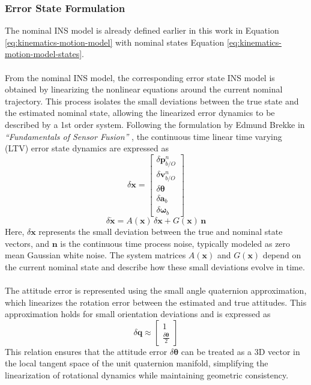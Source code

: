 \subsubsection{Error State Formulation}
The nominal INS model is already defined earlier in this work in Equation \ref{eq:kinematics-motion-model} with nominal states Equation \ref{eq:kinematics-motion-model-states}.
\\ \\
From the nominal INS model, the corresponding error state INS model is obtained by linearizing the nonlinear equations around the current nominal trajectory. This process isolates the small deviations between the true state and the estimated nominal state, allowing the linearized error dynamics to be described by a 1st order system. Following the formulation by Edmund Brekke in \textit{``Fundamentals of Sensor Fusion''} \cite{sensor_fusion_book}, the continuous time linear time varying (LTV) error state dynamics are expressed as
$$
    \delta\mathbf{x} =
    \begin{bmatrix}
        \delta\mathbf{p}_{b/O}^{n} \\
        \delta\mathbf{v}_{b/O}^{n} \\
        \delta\mathbf{\theta} \\
        \delta\mathbf{a}_b \\
        \delta\mathbf{\omega}_b
    \end{bmatrix}
$$
$$
    \delta\dot{\mathbf{x}} = A(\mathbf{x}) \, \delta\mathbf{x} + G(\mathbf{x})\,\mathbf{n}
$$
Here, $\delta\mathbf{x}$ represents the small deviation between the true and nominal state vectors, and $\mathbf{n}$ is the continuous time process noise, typically modeled as zero mean Gaussian white noise. The system matrices $A(\mathbf{x})$ and $G(\mathbf{x})$ depend on the current nominal state and describe how these small deviations evolve in time.  
\\ \\
The attitude error is represented using the small angle quaternion approximation, which linearizes the rotation error between the estimated and true attitudes. This approximation holds for small orientation deviations and is expressed as
$$
    \delta\mathbf{q} \approx
    \begin{bmatrix}
        1 \\
        \tfrac{\delta\boldsymbol{\theta}}{2}
    \end{bmatrix}
$$
This relation ensures that the attitude error $\delta\boldsymbol{\theta}$ can be treated as a 3D vector in the local tangent space of the unit quaternion manifold, simplifying the linearization of rotational dynamics while maintaining geometric consistency.  



